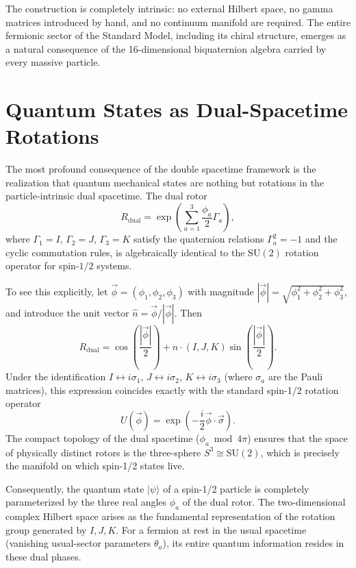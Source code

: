 \documentclass[dvipdfmx,11pt,a4paper]{article}
\begin{document}
The construction is completely intrinsic: no external Hilbert space, no gamma matrices introduced by hand, and no continuum manifold are required. The entire fermionic sector of the Standard Model, including its chiral structure, emerges as a natural consequence of the 16-dimensional biquaternion algebra carried by every massive particle.

\section{Quantum States as Dual-Spacetime Rotations}
\label{sec:quantumstates}

The most profound consequence of the double spacetime framework is the realization that quantum mechanical states are nothing but rotations in the particle-intrinsic dual spacetime. The dual rotor
\[
R_\text{dual} = \exp\left( \sum_{a=1}^3 \frac{\phi_a}{2} \Gamma_a \right),
\]
where $\Gamma_1 = I$, $\Gamma_2 = J$, $\Gamma_3 = K$ satisfy the quaternion relations $\Gamma_a^2 = -1$ and the cyclic commutation rules, is algebraically identical to the $\mathrm{SU}(2)$ rotation operator for spin-$1/2$ systems.

To see this explicitly, let $\vec{\phi}=(\phi_1,\phi_2,\phi_3)$ with magnitude $|\vec{\phi}|=\sqrt{\phi_1^2+\phi_2^2+\phi_3^2}$, and introduce the unit vector $\hat{n}=\vec{\phi}/|\vec{\phi}|$. Then
\[
R_\text{dual} = \cos\left( \frac{|\vec{\phi}|}{2} \right) + \hat{n} \cdot (I, J, K) \sin\left( \frac{|\vec{\phi}|}{2} \right).
\]
Under the identification $I \leftrightarrow i\sigma_1$, $J \leftrightarrow i\sigma_2$, $K \leftrightarrow i\sigma_3$ (where $\sigma_a$ are the Pauli matrices), this expression coincides exactly with the standard spin-1/2 rotation operator
\[
U(\vec{\phi}) = \exp\left( -\frac{i}{2} \vec{\phi} \cdot \vec{\sigma} \right).
\]
The compact topology of the dual spacetime ($\phi_a \bmod 4\pi$) ensures that the space of physically distinct rotors is the three-sphere $S^3 \cong \mathrm{SU}(2)$, which is precisely the manifold on which spin-1/2 states live.

Consequently, the quantum state $|\psi\rangle$ of a spin-1/2 particle is completely parameterized by the three real angles $\phi_a$ of the dual rotor. The two-dimensional complex Hilbert space arises as the fundamental representation of the rotation group generated by $I, J, K$. For a fermion at rest in the usual spacetime (vanishing usual-sector parameters $\theta_a$), its entire quantum information resides in these dual phases.
\end{document}
